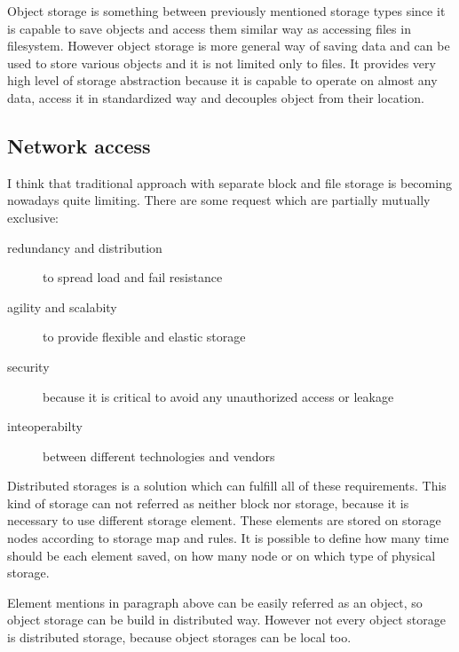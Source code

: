 Object storage is something between previously mentioned storage types since it is capable to save objects and access them similar way as accessing files in filesystem. However object storage is more general way of saving data and can be used to store various objects and it is not limited only to files. It provides very high level of storage abstraction because it is capable to operate on almost any data, access it in standardized way and decouples object from their location.
\label{par:object-storage}


\subsection{Network access}
I think that traditional approach with separate block and file storage is becoming nowadays quite limiting. There are some request which are partially mutually exclusive:
\begin{description}
	\item[redundancy and distribution] to spread load and fail resistance
	\item[agility and scalabity] to provide flexible and elastic storage
	\item[security] because it is critical to avoid any unauthorized access or leakage
	\item[inteoperabilty] between different technologies and vendors
\end{description}

Distributed storages is a solution which can fulfill all of these requirements. This kind of storage can not referred as neither block nor storage, because it is necessary to use different storage element. These elements are stored on storage nodes according to storage map and rules. It is possible to define how many time should be each element saved, on how many node or on which type of physical storage.

Element mentions in paragraph above can be easily referred as an object, so object storage can be build in distributed way. However not every object storage is distributed storage, because object storages can be local too.

